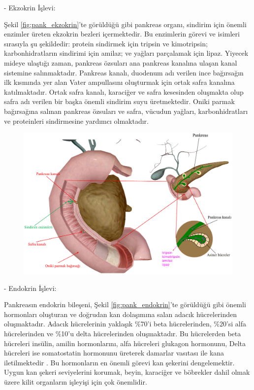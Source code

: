 -  Ekzokrin İşlevi:

Şekil \ref{fig:pank_ekzokrin}’te görüldüğü gibi pankreas organı, sindirim için önemli enzimler üreten ekzokrin bezleri içermektedir. Bu enzimlerin görevi ve isimleri sırasıyla şu şekildedir: protein sindirmek için tripsin ve kimotripsin; karbonhidratların sindirimi için amilaz; ve yağları parçalamak için lipaz. Yiyecek mideye ulaştığı zaman, pankreas özsuları ana pankreas kanalına ulaşan kanal sistemine salınmaktadır. Pankreas kanalı, duodenum adı verilen ince bağırsağın ilk kısmında yer alan Vater ampullasını oluşturmak için ortak safra kanalına katılmaktadır. Ortak safra kanalı, karaciğer ve safra kesesinden oluşmakta olup safra adı verilen bir başka önemli sindirim suyu üretmektedir. Oniki parmak bağırsağına salınan pankreas özsuları ve safra, vücudun yağları, karbonhidratları ve proteinleri sindirmesine yardımcı olmaktadır.

\begin{figure}[h!]
	\begin{center}
		\vspace{0.4cm}
		{
			\vspace{0.4cm}
			\includegraphics[scale=0.55]{Genel-Bilgiler/Figures/ekzokrin_function.pdf}
		}
	\end{center}
\end{figure}

- Endokrin İşlevi:

Pankreasın endokrin bileşeni, Şekil \ref{fig:pank_endokrin}’te görüldüğü gibi önemli hormonları oluşturan ve doğrudan kan dolaşımına salan adacık hücrelerinden oluşmaktadır. Adacık hücrelerinin yaklaşık \%70'i beta hücrelerinden, \%20'si alfa hücrelerinden ve \%10'u delta hücrelerinden oluşmaktadır. Bu hücrelerden beta hücreleri insülin, amilin hormonlarını, alfa hücreleri glukagon hormonunu, Delta hücreleri ise somatostatin hormonunu üreterek damarlar vasıtası ile kana iletilmektedir \cite{krahl1974endocrine}. Bu hormonların en önemli görevi kan şekerini dengelemektir.  Uygun kan şekeri seviyelerini korumak, beyin, karaciğer ve böbrekler dahil olmak üzere kilit organların işleyişi için çok önemlidir.


